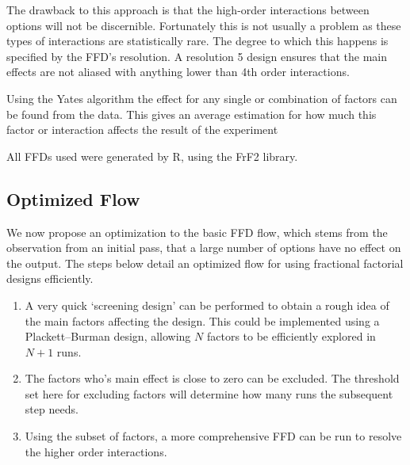 \documentclass[twocolumn]{article}
\begin{document}
The drawback to this approach is that the high-order interactions between options will not be discernible. Fortunately this is not usually a problem as these types of interactions are statistically rare. The degree to which this happens is specified by the FFD's resolution\cite{BoxHunter}. A resolution 5 design ensures that the main effects are not aliased with anything lower than 4th order interactions.

Using the Yates algorithm the effect for any single or combination of factors can be found from the data. This gives an average estimation for how much this factor or interaction affects the result of the experiment




All FFDs used were generated by R, using the FrF2 library\cite{FrF2}.

\subsection*{Optimized Flow}

We now propose an optimization to the basic FFD flow, which stems from the observation from an initial pass, that a large number of options have no effect on the output. The steps below detail an optimized flow for using fractional factorial designs efficiently.
\begin{enumerate}
	\setlength{\itemsep}{0em}
	\vspace{-1mm}
	\item A very quick `screening design' can be performed to obtain a rough idea of the main factors affecting the design. This could be implemented using a Plackett–Burman design\cite{Bose1940}, allowing $N$ factors to be efficiently explored in $N+1$ runs.
	\item The factors who's main effect is close to zero can be excluded. The threshold set here for excluding factors will determine how many runs the subsequent step needs.
	\item Using the subset of factors, a more comprehensive FFD can be run to resolve the higher order interactions.
\end{enumerate}
\end{document}

